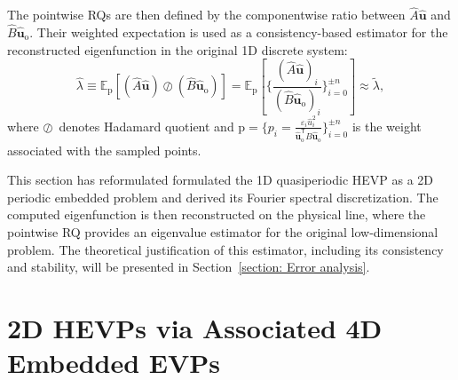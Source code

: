 \documentclass[11pt]{article}
\newcommand{\tr}{\textcolor{red}}
\def\u{\mathbf{u}}
\numberwithin{equation}{section}
\begin{document}
The pointwise RQs are then defined by the componentwise ratio between $\widehat{A}\widehat{\mathbf{u}}$ and $\widehat{B}\widehat{\mathbf{u}}_{\mathrm{o}}$. Their weighted expectation is used as a consistency-based estimator for the reconstructed eigenfunction in the original 1D discrete system:
\begin{equation} \label{def: expectation of ratio}
\widehat{\lambda}
\equiv
\mathbb{E}_{\mathrm{p}} \left[
\left(\widehat{A}\widehat{\mathbf{u}}\right)\oslash\left(\widehat{B}\widehat{\mathbf{u}}_{\mathrm{o}}\right)
\right] = \mathbb{E}_{\mathrm{p}}\left[\Bigg\{\frac{\left(\widehat{A}\widehat{\u}\right)_i}{\left(\widehat{B}\widehat{\u}_{\mathrm{o}}\right)_i} \Bigg\}_{i=0}^{\pm n}\right]
\approx \widetilde{\lambda},
\end{equation}
where $\oslash\,$ denotes Hadamard quotient and $\mathrm{p} = \{p_i = \frac{\varepsilon_i \widehat{u}_i^2}{\widehat{\mathbf{u}}_{\mathrm{o}}^\mathsf{T} \widehat{B}\widehat{\mathbf{u}}_{\mathrm{o}}}\}_{i=0}^{\pm n}$ is the weight associated with the sampled points.


This section has reformulated formulated the 1D quasiperiodic HEVP as a 2D periodic embedded problem and derived its Fourier spectral discretization. The computed
eigenfunction is then reconstructed on the physical line, where the pointwise RQ provides an eigenvalue estimator for the original low-dimensional problem. The theoretical justification of this estimator, including its consistency and stability, will be presented in Section~\ref{section: Error analysis}.

\section{2D HEVPs via Associated 4D Embedded EVPs} \label{section: 2Dto4D}
\end{document}
